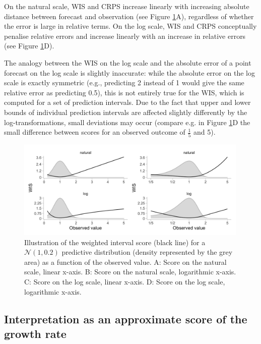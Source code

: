 \documentclass{article}
\begin{document}
On the natural scale, WIS and CRPS increase linearly with increasing absolute distance between forecast and observation (see Figure \ref{fig:change-in-scores}A), regardless of whether the error is large in relative terms. On the log scale, WIS and CRPS conceptually penalise relative errors and increase linearly with an increase in relative errors (see Figure \ref{fig:change-in-scores}D). 

The analogy between the WIS on the log scale and the absolute error of a point forecast on the log scale is slightly inaccurate: while the absolute error on the log scale is exactly symmetric (e.g., predicting 2 instead of 1 would give the same relative error as predicting 0.5), this is not entirely true for the WIS, which is computed for a set of prediction intervals. Due to the fact that upper and lower bounds of individual prediction intervals are affected slightly differently by the log-transformations, small deviations may occur (compare e.g. in Figure \ref{fig:change-in-scores}D the small difference between scores for an observed outcome of $\frac{1}{5}$ and 5). 

\begin{figure}[h!]
    \centering
    \includegraphics[width=0.99\textwidth]{output/figures/SIM-effect-log-score.png}
    \caption{Illustration of the weighted interval score (black line) for a $\mathcal{N}(1, 0.2)$ predictive distribution (density represented by the grey area) as a function of the observed value. A: Score on the natural scale, linear x-axis. B: Score on the natural scale, logarithmic x-axis. C: Score on the log scale, linear x-axis. D: Score on the log scale, logarithmic x-axis.} 
    \label{fig:change-in-scores}
\end{figure}





\subsection{Interpretation as an approximate score of the growth rate}
\label{sec:methods:growthrate}
\end{document}
